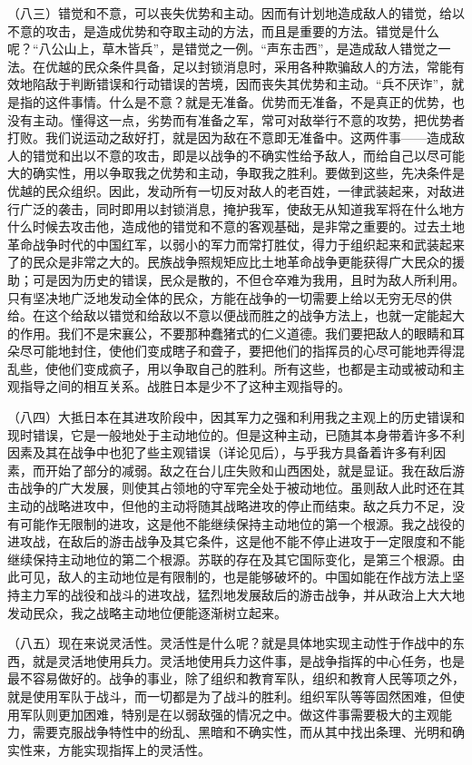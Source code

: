 （八三）错觉和不意，可以丧失优势和主动。因而有计划地造成敌人的错觉，给以不意的攻击，是造成优势和夺取主动的方法，而且是重要的方法。错觉是什么呢？“八公山上，草木皆兵”，是错觉之一例。“声东击西”，是造成敌人错觉之一法。在优越的民众条件具备，足以封锁消息时，采用各种欺骗敌人的方法，常能有效地陷敌于判断错误和行动错误的苦境，因而丧失其优势和主动。“兵不厌诈”，就是指的这件事情。什么是不意？就是无准备。优势而无准备，不是真正的优势，也没有主动。懂得这一点，劣势而有准备之军，常可对敌举行不意的攻势，把优势者打败。我们说运动之敌好打，就是因为敌在不意即无准备中。这两件事——造成敌人的错觉和出以不意的攻击，即是以战争的不确实性给予敌人，而给自己以尽可能大的确实性，用以争取我之优势和主动，争取我之胜利。要做到这些，先决条件是优越的民众组织。因此，发动所有一切反对敌人的老百姓，一律武装起来，对敌进行广泛的袭击，同时即用以封锁消息，掩护我军，使敌无从知道我军将在什么地方什么时候去攻击他，造成他的错觉和不意的客观基础，是非常之重要的。过去土地革命战争时代的中国红军，以弱小的军力而常打胜仗，得力于组织起来和武装起来了的民众是非常之大的。民族战争照规矩应比土地革命战争更能获得广大民众的援助；可是因为历史的错误，民众是散的，不但仓卒难为我用，且时为敌人所利用。只有坚决地广泛地发动全体的民众，方能在战争的一切需要上给以无穷无尽的供给。在这个给敌以错觉和给敌以不意以便战而胜之的战争方法上，也就一定能起大的作用。我们不是宋襄公，不要那种蠢猪式的仁义道德。我们要把敌人的眼睛和耳朵尽可能地封住，使他们变成瞎子和聋子，要把他们的指挥员的心尽可能地弄得混乱些，使他们变成疯子，用以争取自己的胜利。所有这些，也都是主动或被动和主观指导之间的相互关系。战胜日本是少不了这种主观指导的。

（八四）大抵日本在其进攻阶段中，因其军力之强和利用我之主观上的历史错误和现时错误，它是一般地处于主动地位的。但是这种主动，已随其本身带着许多不利因素及其在战争中也犯了些主观错误（详论见后），与乎我方具备着许多有利因素，而开始了部分的减弱。敌之在台儿庄失败和山西困处，就是显证。我在敌后游击战争的广大发展，则使其占领地的守军完全处于被动地位。虽则敌人此时还在其主动的战略进攻中，但他的主动将随其战略进攻的停止而结束。敌之兵力不足，没有可能作无限制的进攻，这是他不能继续保持主动地位的第一个根源。我之战役的进攻战，在敌后的游击战争及其它条件，这是他不能不停止进攻于一定限度和不能继续保持主动地位的第二个根源。苏联的存在及其它国际变化，是第三个根源。由此可见，敌人的主动地位是有限制的，也是能够破坏的。中国如能在作战方法上坚持主力军的战役和战斗的进攻战，猛烈地发展敌后的游击战争，并从政治上大大地发动民众，我之战略主动地位便能逐渐树立起来。

（八五）现在来说灵活性。灵活性是什么呢？就是具体地实现主动性于作战中的东西，就是灵活地使用兵力。灵活地使用兵力这件事，是战争指挥的中心任务，也是最不容易做好的。战争的事业，除了组织和教育军队，组织和教育人民等项之外，就是使用军队于战斗，而一切都是为了战斗的胜利。组织军队等等固然困难，但使用军队则更加困难，特别是在以弱敌强的情况之中。做这件事需要极大的主观能力，需要克服战争特性中的纷乱、黑暗和不确实性，而从其中找出条理、光明和确实性来，方能实现指挥上的灵活性。

